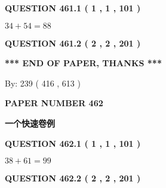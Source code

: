 \documentclass{ctexart}
\begin{document}
{\textbf{\Large{QUESTION
461.1 
 ( 1 , 1 , 101 )
}}}
  
  
 
 

$ %
34 +  %
54=   %
88$
 
 
  
\vspace{0.2in}
  
{\textbf{\Large{QUESTION
461.2 
 ( 2 , 2 , 201 )
}}}
  
  
   
   
 \vspace{0.2in}
 
   
   
   
   
\vspace{1.0in} 
{\textbf{\large{ *** END OF PAPER, THANKS *** }}} 
   
   
\hspace{1.0in} By: 
 239 ( 416 ,  613 )
   
   
   
   
\newpage 
\setcounter{page}{ 
   462001 } 
   
   
   
   
 {\textbf{ \Large{ PAPER NUMBER  462  }}}
   
   
\vspace{0.2in}
   
   
   
   
   
   
 \vspace{0.2in}
{\LARGE {\textbf{ 一个快速卷例}}}
   
   
  
\vspace{0.2in}
  
{\textbf{\Large{QUESTION
462.1 
 ( 1 , 1 , 101 )
}}}
  
  
 
 

$ %
38 +  %
61=   %
99$
 
 
  
\vspace{0.2in}
  
{\textbf{\Large{QUESTION
462.2 
 ( 2 , 2 , 201 )
}}}
  
  
   
   
 \vspace{0.2in}
 
   
   
\end{document}
